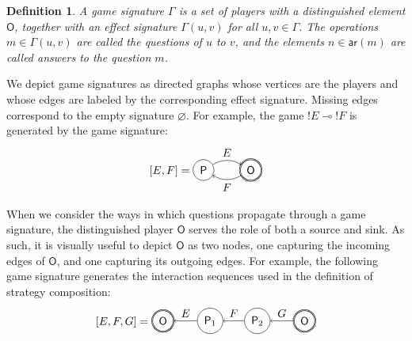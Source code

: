 \documentclass[draft,11pt]{report}
\newtheorem{definition}{Definition}
\newcommand{\kw}[1]{\ensuremath{ \mathsf{#1} }}
\begin{document}
\begin{definition}
A \emph{game signature} $\Gamma$
is a set of players with a distinguished element $\kw{O}$,
together with an effect signature $\Gamma(u, v)$
for all $u, v \in \Gamma$.
The operations $m \in \Gamma(u, v)$ are called
the \emph{questions} of $u$ to $v$,
and the elements $n \in \kw{ar}(m)$ are called
\emph{answers} to the question $m$.
\end{definition}

We depict game signatures as directed graphs
whose vertices are the players and
whose edges are labeled by the corresponding effect signature.
Missing edges correspond to the empty signature $\varnothing$.
For example,
the game ${!E} \multimap {!F}$ is generated by
the game signature:
\[
  [E,F] =
  \begin{tikzpicture}[baseline=(O.base),scale=1.5]
    \node[circle,draw,double] (O) at (0,0) {$\kw{O}$};
    \node[circle,draw] (P) at (-1,0) {$\kw{P}$};
    \path[->] (P) edge[bend left] node[above] {$E$} (O);
    \path[->] (O) edge[bend left] node[below] {$F$} (P);
  \end{tikzpicture}
\]

When we consider the ways in which questions propagate
through a game signature, %
the distinguished player $\kw{O}$ serves the role
of both a source and sink.
As such, it is visually useful
to depict $\kw{O}$ as two nodes,
one capturing the incoming edges of $\kw{O}$, and
one capturing its outgoing edges.
For example,
the following game signature
generates the interaction sequences
used in the definition of
strategy composition:
\[
  [E,F,G] =
  \begin{tikzpicture}[baseline=(O1.base),scale=1.5]
    \node[circle,double,draw] (O1) at (0,0) {$\kw{O}$};
    \node[circle,draw] (P1) at (-1,0) {$\kw{P}_2$};
    \node[circle,draw] (P2) at (-2,0) {$\kw{P}_1$};
    \node[circle,double,draw] (O2) at (-3,0) {$\kw{O}$};
    \path[->] (O1) edge node[above] {$G$} (P1);
    \path[->] (P1) edge node[above] {$F$} (P2);
    \path[->] (P2) edge node[above] {$E$} (O2);
  \end{tikzpicture}
\]
\end{document}
